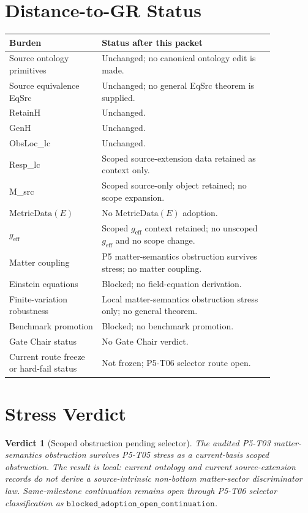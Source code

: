 \documentclass[11pt]{article}
\newcommand{\MetricData}{\mathrm{MetricData}}
\newcommand{\geff}{g_{\mathrm{eff}}}
\newtheorem{verdict}{Verdict}
\begin{document}
\section{Distance-to-GR Status}

\begin{longtable}{p{0.30\linewidth}p{0.56\linewidth}}
\toprule
Burden & Status after this packet \\
\midrule
Source ontology primitives & Unchanged; no canonical ontology edit is made. \\
Source equivalence EqSrc & Unchanged; no general EqSrc theorem is supplied. \\
RetainH & Unchanged. \\
GenH & Unchanged. \\
ObsLoc\_lc & Unchanged. \\
Resp\_lc & Scoped source-extension data retained as context only. \\
M\_src & Scoped source-only object retained; no scope expansion. \\
\(\MetricData(E)\) & No \(\MetricData(E)\) adoption. \\
\(\geff\) & Scoped \(\geff\) context retained; no unscoped \(\geff\) and no scope change. \\
Matter coupling & P5 matter-semantics obstruction survives stress; no matter coupling. \\
Einstein equations & Blocked; no field-equation derivation. \\
Finite-variation robustness & Local matter-semantics obstruction stress only; no general theorem. \\
Benchmark promotion & Blocked; no benchmark promotion. \\
Gate Chair status & No Gate Chair verdict. \\
Current route freeze or hard-fail status & Not frozen; P5-T06 selector route open. \\
\bottomrule
\end{longtable}

\section{Stress Verdict}

\begin{verdict}[Scoped obstruction pending selector]
The audited P5-T03 matter-semantics obstruction survives P5-T05 stress as a
current-basis scoped obstruction. The result is local: current ontology and
current source-extension records do not derive a source-intrinsic non-bottom
matter-sector discriminator law. Same-milestone continuation remains open
through P5-T06 selector classification as
\(\mathtt{blocked\_adoption\_open\_continuation}\).
\end{verdict}
\end{document}

